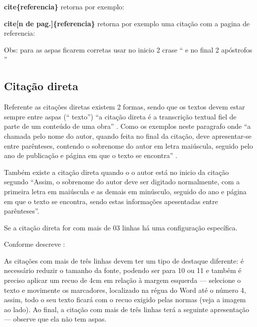 \textbf{cite\{referencia\}} retorna por exemplo: \cite{kitchenham2009systematic}

\textbf{cite[n de pag.]\{referencia\}}  retorna por exemplo uma citação com a pagina de referencia: \cite[p.20]{kitchenham2009systematic}

Obs: para as aspas ficarem corretas usar no inicio 2 crase `` e no final 2 apóstrofos ''

\subsection{Citação direta}

Referente as citações diretas existem 2 formas, sendo que os textos devem estar sempre entre aspas (``  texto'') ``a citação direta é a transcrição textual fiel de parte de um conteúdo de uma obra''  \cite{xavier2020}. Como os exemplos neste paragrafo onde ``a chamada pelo nome do autor, quando feita no final da citação, deve apresentar-se entre parênteses, contendo o sobrenome do autor em letra maiúscula, seguido pelo ano de publicação e página em que o texto se encontra'' \cite{xavier2020}. 

Também existe a citação direta quando o o autor está no inicio da citação segundo \textcite{xavier2020} ``Assim, o sobrenome do autor deve ser digitado normalmente, com a primeira letra em maiúscula e as demais em minúsculo, seguido do ano e página em que o texto se encontra, sendo estas informações apesentadas entre parênteses''.


Se a citação direta for com mais de 03 linhas há uma configuração específica.

Conforme descreve \textcite{xavier2020}:

\begin{quoting}[rightmargin=0cm,leftmargin=4cm] %
\begin{singlespace} %
{
\footnotesize %
As citações com mais de três linhas devem ter um tipo de destaque diferente: é necessário reduzir o tamanho da fonte, podendo ser para 10 ou 11 e também é preciso aplicar um recuo de 4cm em relação à margem esquerda — selecione o texto e movimente os marcadores, localizado na régua do Word até o número 4, assim, todo o seu texto ficará com o recuo exigido pelas normas (veja a imagem ao lado). Ao final, a citação com mais de três linhas terá a seguinte apresentação — observe que ela não tem aspas.
}
\end{singlespace} %
\end{quoting} %


